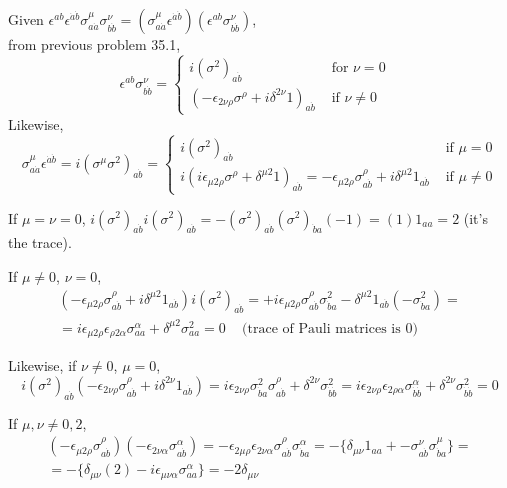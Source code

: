 \documentclass[twoside]{amsart}
\newcommand{\solutionhead}[1]
  {\smallskip
   \noindent{\large\bf Solution #1.}
   }
\begin{document}
\solutionhead{35.4}  Given $\epsilon^{ab} \epsilon^{\dot{a} \dot{b}} \sigma_{a\dot{a}}^{\mu} \sigma^{\nu}_{b\dot{b}} = (\sigma^{\mu}_{a\dot{a}} \epsilon^{\dot{a} \dot{b}} )(\epsilon^{ab} \sigma^{\nu}_{b\dot{b}} )$,  \\
from previous problem 35.1, 
\[
\epsilon^{ab} \sigma^{\nu}_{b\dot{b}} = \begin{cases} i (\sigma^2)_{a\dot{b}} & \text{ for $\nu =0$ } \\ (-\epsilon_{2 \nu \rho} \sigma^{\rho} + i \delta^{2\nu} 1 )_{a\dot{b}} & \text{ if } \nu \neq 0 \end{cases}
\]
Likewise,
\[
\sigma^{\mu}_{a\dot{a}} \epsilon^{\dot{a} \dot{b}} = i (\sigma^{\mu} \sigma^2 )_{a\dot{b}} = \begin{cases} i (\sigma^2)_{a\dot{b}} & \text{ if } \mu = 0 \\ i ( i \epsilon_{\mu 2 \rho } \sigma^{\rho} + \delta^{\mu 2} 1 )_{a\dot{b}} = -\epsilon_{\mu 2 \rho} \sigma^{\rho}_{a \dot{b}} + i \delta^{\mu 2 } 1_{a\dot{b}} & \text{ if } \mu \neq 0 \end{cases}
\]

If $\mu = \nu =0$, $i (\sigma^2)_{a\dot{b}} i (\sigma^2)_{a\dot{b}} = - (\sigma^2)_{a\dot{b}} (\sigma^2)_{\dot{b} a}(-1) = (1) 1_{aa} = 2$ (it's the trace).  

If $\mu \neq 0$, $\nu =0$,
\[
\begin{gathered}
(-\epsilon_{\mu 2 \rho} \sigma^{\rho}_{a\dot{b}} + i \delta^{\mu 2} 1_{a\dot{b}} )i ( \sigma^2)_{a\dot{b}} = + i \epsilon_{\mu 2 \rho} \sigma^{\rho}_{a\dot{b}} \sigma^2_{\dot{b} a} - \delta^{\mu 2} 1_{a\dot{b}} (- \sigma^2_{\dot{b} a} ) = \\
	= i \epsilon_{\mu 2 \rho} \epsilon_{\rho 2 \alpha} \sigma^{\alpha}_{aa} + \delta^{\mu 2} \sigma^2_{aa} = 0 \quad \, \text{(trace of Pauli matrices is 0)}
\end{gathered}
\]

Likewise, if $\nu \neq 0$, $\mu = 0$, 
\[
i(\sigma^2)_{a\dot{b}} (-\epsilon_{2\nu \rho} \sigma^{\rho}_{a\dot{b}} + i \delta^{2\nu} 1_{a\dot{b}} ) = i \epsilon_{2\nu \rho} \sigma^2_{\dot{b} a} \sigma^{\rho}_{a\dot{b}} + \delta^{2\nu} \sigma^2_{\dot{b} \dot{b}} = i \epsilon_{2\nu \rho} \epsilon_{2\rho \alpha} \sigma^{\alpha}_{\dot{b} \dot{b}} + \delta^{2\nu} \sigma^2_{\dot{b} \dot{b}} = 0 
\]

If $\mu, \nu \neq 0 ,2$, 
\[
\begin{gathered}
	(- \epsilon_{\mu 2 \rho} \sigma_{a\dot{b}}^{\rho} )( - \epsilon_{2\nu \alpha} \sigma^{\alpha}_{a\dot{b}} ) = - \epsilon_{2\mu \rho} \epsilon_{2 \nu \alpha} \sigma^{\rho}_{a\dot{b}} \sigma^{\alpha}_{\dot{b} a} = - \lbrace \delta_{\mu \nu} 1_{aa} + - \sigma^{\nu}_{a\dot{b}} \sigma^{\mu}_{\dot{b} a} \rbrace = \\
	= - \lbrace \delta_{\mu \nu} (2) - i \epsilon_{\mu \nu \alpha} \sigma^{\alpha}_{aa} \rbrace = - 2\delta_{\mu \nu} 
\end{gathered}
\]
\end{document}
